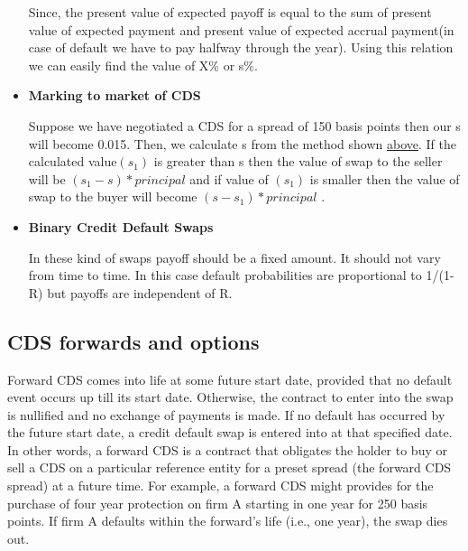 \documentclass[11pt]{article}
\numberwithin{equation}{section}
\begin{document}
\begin{itemize}
	\hspace{1 cm} Since, the present value of expected payoff is equal to the sum of present value of expected payment and present value of expected accrual payment(in case of default we have to pay halfway through the year). Using this relation we can easily find the value of X\% or s\%.\medskip
	    
	  \item \textbf{Marking to market of CDS} 
	  \medskip
	  
	  Suppose we have negotiated a CDS for a spread of 150 basis points then our s will become 0.015. Then, we calculate s from the method shown \hyperref[itm:xyz]{above}. If the calculated value$(s_1)$ is greater than s then the value of swap to the seller will be $(s_1-s)*principal$ and if value of $(s_1)$ is smaller then the value of swap to the buyer will become $(s-s_1)*principal $ . 
	 
	 \item \textbf{Binary Credit Default Swaps} 
	  \medskip
	  
	   In these kind of swaps payoff should be a fixed amount. It should not vary from time to time. In this case default probabilities are proportional to 1/(1-R) but payoffs are independent of R.  
	  \end{itemize}
	  
	   
	   \subsection{CDS forwards and options} 
	  \medskip
	  
	   Forward CDS comes into life at some future start date, provided that no default event occurs up till its start date. Otherwise, the contract to enter into the swap is nullified and no exchange of payments is made. If no default has occurred by the future start date, a credit default swap is entered into at that specified date. In other words, a forward CDS is a contract that obligates the holder to buy or sell a CDS on a particular reference entity for a preset spread (the forward CDS spread) at a future time. For example, a forward CDS might provides for the purchase of four year protection on firm A starting in one year for 250 basis points. If firm A defaults within the forward's life (i.e., one year), the swap dies out.\medskip
	   
\end{document}
